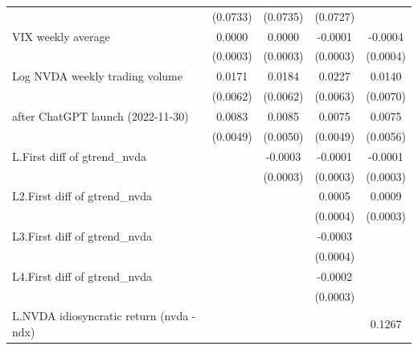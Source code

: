 \begin{table}[htbp]
\begin{tabular}{l*{4}{c}}
                    &    (0.0733)         &    (0.0735)         &    (0.0727)         &                     \\
\addlinespace
VIX weekly average  &      0.0000         &      0.0000         &     -0.0001         &     -0.0004         \\
                    &    (0.0003)         &    (0.0003)         &    (0.0003)         &    (0.0004)         \\
\addlinespace
Log NVDA weekly trading volume&      0.0171\sym{***}&      0.0184\sym{***}&      0.0227\sym{***}&      0.0140\sym{**} \\
                    &    (0.0062)         &    (0.0062)         &    (0.0063)         &    (0.0070)         \\
\addlinespace
=1 after ChatGPT launch (2022-11-30)&      0.0083\sym{*}  &      0.0085\sym{*}  &      0.0075         &      0.0075         \\
                    &    (0.0049)         &    (0.0050)         &    (0.0049)         &    (0.0056)         \\
\addlinespace
L.First diff of gtrend\_nvda&                     &     -0.0003         &     -0.0001         &     -0.0001         \\
                    &                     &    (0.0003)         &    (0.0003)         &    (0.0003)         \\
\addlinespace
L2.First diff of gtrend\_nvda&                     &                     &      0.0005         &      0.0009\sym{***}\\
                    &                     &                     &    (0.0004)         &    (0.0003)         \\
\addlinespace
L3.First diff of gtrend\_nvda&                     &                     &     -0.0003         &                     \\
                    &                     &                     &    (0.0004)         &                     \\
\addlinespace
L4.First diff of gtrend\_nvda&                     &                     &     -0.0002         &                     \\
                    &                     &                     &    (0.0003)         &                     \\
\addlinespace
L.NVDA idiosyncratic return (nvda - ndx)&                     &                     &                     &      0.1267\sym{**} \\

\end{tabular}
\end{table}
